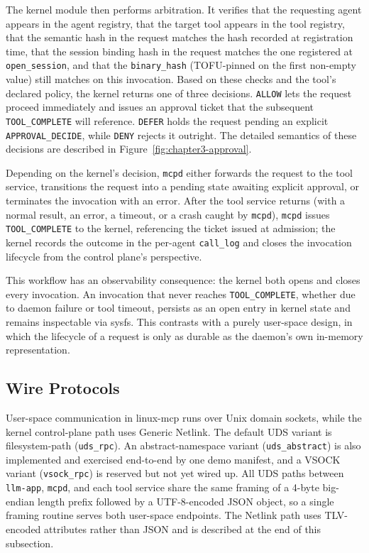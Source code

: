The kernel module then performs arbitration.
It verifies that the requesting agent appears in the agent registry, that the target tool appears in the tool registry, that the semantic hash in the request matches the hash recorded at registration time, that the session binding hash in the request matches the one registered at \texttt{open\_\allowbreak session}, and that the \texttt{binary\_\allowbreak hash} (TOFU-pinned on the first non-empty value) still matches on this invocation.
Based on these checks and the tool's declared policy, the kernel returns one of three decisions. \texttt{ALLOW} lets the request proceed immediately and issues an approval ticket that the subsequent \texttt{TOOL\_\allowbreak COMPLETE} will reference. \texttt{DEFER} holds the request pending an explicit \texttt{APPROVAL\_\allowbreak DECIDE}, while \texttt{DENY} rejects it outright.
The detailed semantics of these decisions are described in Figure~\ref{fig:chapter3-approval}.

Depending on the kernel's decision, \texttt{mcpd} either forwards the request to the tool service, transitions the request into a pending state awaiting explicit approval, or terminates the invocation with an error.
After the tool service returns (with a normal result, an error, a timeout, or a crash caught by \texttt{mcpd}), \texttt{mcpd} issues \texttt{TOOL\_\allowbreak COMPLETE} to the kernel, referencing the ticket issued at admission; the kernel records the outcome in the per-agent \texttt{call\_\allowbreak log} and closes the invocation lifecycle from the control plane's perspective.

This workflow has an observability consequence: the kernel both opens and closes every invocation.
An invocation that never reaches \texttt{TOOL\_\allowbreak COMPLETE}, whether due to daemon failure or tool timeout, persists as an open entry in kernel state and remains inspectable via sysfs.
This contrasts with a purely user-space design, in which the lifecycle of a request is only as durable as the daemon's own in-memory representation.



\subsection{Wire Protocols}
\label{sec:wire-protocols}

User-space communication in linux-mcp runs over Unix domain sockets, while the kernel control-plane path uses Generic Netlink. The default UDS variant is filesystem-path (\texttt{uds\_rpc}). An abstract-namespace variant (\texttt{uds\_abstract}) is also implemented and exercised end-to-end by one demo manifest, and a VSOCK variant (\texttt{vsock\_rpc}) is reserved but not yet wired up. All UDS paths between \texttt{llm-app}, \texttt{mcpd}, and each tool service share the same framing of a 4-byte big-endian length prefix followed by a UTF-8-encoded JSON object, so a single framing routine serves both user-space endpoints. The Netlink path uses TLV-encoded attributes rather than JSON and is described at the end of this subsection.

